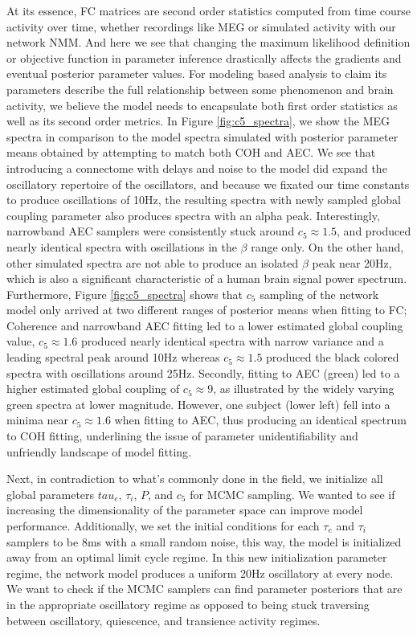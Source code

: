 At its essence, FC matrices are second order statistics computed from time course activity over time, whether recordings like MEG or simulated activity with our network NMM. And here we see that changing the maximum likelihood definition or objective function in parameter inference drastically affects the gradients and eventual posterior parameter values. For modeling based analysis to claim its parameters describe the full relationship between some phenomenon and brain activity, we believe the model needs to encapsulate both first order statistics as well as its second order metrics. In Figure \ref{fig:c5_spectra}, we show the MEG spectra in comparison to the model spectra simulated with posterior parameter means obtained by attempting to match both COH and AEC. We see that introducing a connectome with delays and noise to the model did expand the oscillatory repertoire of the oscillators, and because we fixated our time constants to produce oscillations of 10Hz, the resulting spectra with newly sampled global coupling parameter also produces spectra with an alpha peak. Interestingly, narrowband AEC samplers were consistently stuck around $c_5 \approx 1.5$, and produced nearly  identical spectra with oscillations in the $\beta$ range only. On the other hand, other simulated spectra are not able to produce an isolated $\beta$ peak near 20Hz, which is also a significant characteristic of a human brain signal power spectrum. Furthermore, Figure \ref{fig:c5_spectra} shows that $c_5$ sampling of the network model only arrived at two different ranges of posterior means when fitting to FC; Coherence and narrowband AEC fitting led to a lower estimated global coupling value, $c_5 \approx 1.6$ produced nearly identical spectra with narrow variance and a leading spectral peak around 10Hz whereas $c_5 \approx 1.5$ produced the black colored spectra with oscillations around 25Hz. Secondly, fitting to AEC (green) led to a higher estimated global coupling of $c_5 \approx 9$, as illustrated by the widely varying green spectra at lower magnitude. However, one subject (lower left) fell into a minima near $c_5 \approx 1.6$ when fitting to AEC, thus producing an identical spectrum to COH fitting, underlining the issue of parameter unidentifiability and unfriendly landscape of model fitting.

Next, in contradiction to what's commonly done in the field, we initialize all global parameters $tau_e$, $\tau_i$, $P$, and $c_5$ for MCMC sampling. We wanted to see if increasing the dimensionality of the parameter space can improve model performance. Additionally, we set the initial conditions for each $\tau_e$ and $\tau_i$ samplers to be $8$ms with a small random noise, this way, the model is initialized away from an optimal limit cycle regime. In this new initialization parameter regime, the network model produces a uniform 20Hz oscillatory at every node. We want to check if the MCMC samplers can find parameter posteriors that are in the appropriate oscillatory regime as opposed to being stuck traversing between oscillatory, quiescence, and transience activity regimes. 

